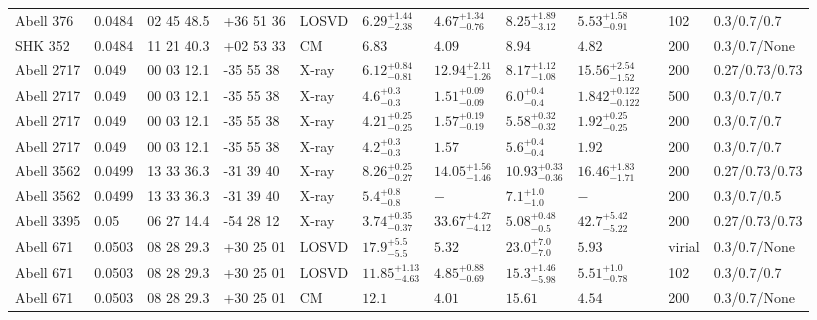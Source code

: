 \begin{landscape}
\begin{center}
{\begin{longtable}{llllllllllll}
Abell 376 & 0.0484 & 02 45 48.5 & +36 51 36 & LOSVD & ${6.29}^{+1.44}_{-2.38}$ & ${4.67}^{+1.34}_{-0.76}$ & ${8.25}^{+1.89}_{-3.12}$ & ${5.53}^{+1.58}_{-0.91}$ & \citet{WO10.1} & 102 & 0.3/0.7/0.7 \\
SHK 352 & 0.0484 & 11 21 40.3 & +02 53 33 & CM & ${6.83}^{}_{}$ & ${4.09}^{}_{}$ & ${8.94}^{}_{}$ & ${4.82}^{}_{}$ & \citet{RI06.1} & 200 & 0.3/0.7/None \\
Abell 2717 & 0.049 & 00 03 12.1 & -35 55 38 & X-ray & ${6.12}^{+0.84}_{-0.81}$ & ${12.94}^{+2.11}_{-1.26}$ & ${8.17}^{+1.12}_{-1.08}$ & ${15.56}^{+2.54}_{-1.52}$ & \citet{BA14.1} & 200 & 0.27/0.73/0.73 \\
Abell 2717 & 0.049 & 00 03 12.1 & -35 55 38 & X-ray & ${4.6}^{+0.3}_{-0.3}$ & ${1.51}^{+0.09}_{-0.09}$ & ${6.0}^{+0.4}_{-0.4}$ & ${1.842}^{+0.122}_{-0.122}$ & \citet{GA06.1} & 500 & 0.3/0.7/0.7 \\
Abell 2717 & 0.049 & 00 03 12.1 & -35 55 38 & X-ray & ${4.21}^{+0.25}_{-0.25}$ & ${1.57}^{+0.19}_{-0.19}$ & ${5.58}^{+0.32}_{-0.32}$ & ${1.92}^{+0.25}_{-0.25}$ & \citet{PO05.1} & 200 & 0.3/0.7/0.7 \\
Abell 2717 & 0.049 & 00 03 12.1 & -35 55 38 & X-ray & ${4.2}^{+0.3}_{-0.3}$ & ${1.57}^{}_{}$ & ${5.6}^{+0.4}_{-0.4}$ & ${1.92}^{}_{}$ & \citet{PR05.1} & 200 & 0.3/0.7/0.7 \\
Abell 3562 & 0.0499 & 13 33 36.3 & -31 39 40 & X-ray & ${8.26}^{+0.25}_{-0.27}$ & ${14.05}^{+1.56}_{-1.46}$ & ${10.93}^{+0.33}_{-0.36}$ & ${16.46}^{+1.83}_{-1.71}$ & \citet{BA14.1} & 200 & 0.27/0.73/0.73 \\
Abell 3562 & 0.0499 & 13 33 36.3 & -31 39 40 & X-ray & ${5.4}^{+0.8}_{-0.8}$ & ${-}^{}_{}$ & ${7.1}^{+1.0}_{-1.0}$ & ${-}^{}_{}$ & \citet{XU01.1} & 200 & 0.3/0.7/0.5 \\
Abell 3395 & 0.05 & 06 27 14.4 & -54 28 12 & X-ray & ${3.74}^{+0.35}_{-0.37}$ & ${33.67}^{+4.27}_{-4.12}$ & ${5.08}^{+0.48}_{-0.5}$ & ${42.7}^{+5.42}_{-5.22}$ & \citet{BA14.1} & 200 & 0.27/0.73/0.73 \\
Abell 671 & 0.0503 & 08 28 29.3 & +30 25 01 & LOSVD & ${17.9}^{+5.5}_{-5.5}$ & ${5.32}^{}_{}$ & ${23.0}^{+7.0}_{-7.0}$ & ${5.93}^{}_{}$ & \citet{AB11.1} & virial & 0.3/0.7/None \\
Abell 671 & 0.0503 & 08 28 29.3 & +30 25 01 & LOSVD & ${11.85}^{+1.13}_{-4.63}$ & ${4.85}^{+0.88}_{-0.69}$ & ${15.3}^{+1.46}_{-5.98}$ & ${5.51}^{+1.0}_{-0.78}$ & \citet{WO10.1} & 102 & 0.3/0.7/0.7 \\
Abell 671 & 0.0503 & 08 28 29.3 & +30 25 01 & CM & ${12.1}^{}_{}$ & ${4.01}^{}_{}$ & ${15.61}^{}_{}$ & ${4.54}^{}_{}$ & \citet{RI06.1} & 200 & 0.3/0.7/None \\

\end{longtable}}
\end{center}
\end{landscape}
